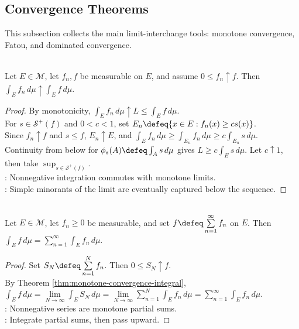 \subsection{Convergence Theorems}

%

This subsection collects the main limit-interchange tools: monotone convergence, Fatou, and dominated convergence.

\begin{theorem} \label{thm:lebesgue-product-main-source-todo}\label{thm:lebesgue-convergence-theorems}\label{thm:monotone-convergence-integral} \\
Let $E\in\mathcal{M}$, let $f_n,f$ be measurable on $E$, and assume $0\leq f_n\uparrow f$. Then $\int_E f_n\,d\mu\uparrow\int_E f\,d\mu$.
\begin{proof}
By monotonicity, $\int_Ef_n\,d\mu\uparrow L\leq\int_Ef\,d\mu$.\\
For $s\in\mathcal{S}^+(f)$ and $0<c<1$, set $E_n\defeq\{x\in E:f_n(x)\geq cs(x)\}$.\\
Since $f_n\uparrow f$ and $s\leq f$, $E_n\uparrow E$, and $\int_Ef_n\,d\mu\geq\int_{E_n}f_n\,d\mu\geq c\int_{E_n}s\,d\mu$.\\
Continuity from below for $\phi_s(A)\defeq\int_As\,d\mu$ gives $L\geq c\int_Es\,d\mu$. Let $c\uparrow1$, then take $\sup_{s\in\mathcal{S}^+(f)}$.\\
: Nonnegative integration commutes with monotone limits.\\
: Simple minorants of the limit are eventually captured below the sequence.
\end{proof}
\end{theorem}

\begin{theorem} \label{thm:nonnegative-series-integral} \\
Let $E\in\mathcal{M}$, let $f_n\geq0$ be measurable, and set $f\defeq\sum\limits_{n=1}^{\infty}f_n$ on $E$. Then $\int_E f\,d\mu=\sum\limits_{n=1}^{\infty}\int_E f_n\,d\mu$.
\begin{proof}
Set $S_N\defeq\sum\limits_{n=1}^{N}f_n$. Then $0\leq S_N\uparrow f$.\\
By Theorem \ref{thm:monotone-convergence-integral}, $\int_Ef\,d\mu=\lim\limits_{N\to\infty}\int_ES_N\,d\mu =\lim\limits_{N\to\infty}\sum\limits_{n=1}^{N}\int_Ef_n\,d\mu =\sum\limits_{n=1}^{\infty}\int_Ef_n\,d\mu$.\\
: Nonnegative series are monotone partial sums.\\
: Integrate partial sums, then pass upward.
\end{proof}
\end{theorem}

